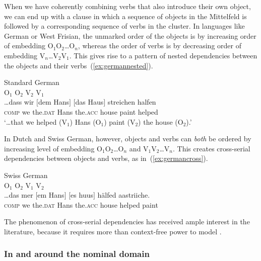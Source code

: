 \documentclass[output=paper,hidelinks]{langscibook}
\begin{document}
When we have coherently combining verbs that also introduce their own
object, we can end up with a clause in which a sequence of objects in
the Mittelfeld is followed by a corresponding sequence of verbs in the
cluster. In languages like German or West Frisian, the
unmarked order of the objects is by increasing order of embedding
O$_1$O$_2$\ldots{}O$_n$, whereas the order of verbs is by decreasing
order of embedding V$_n$\ldots{}V$_2$V$_1$. This gives rise to a
pattern of nested dependencies between the objects and their
verbs~(\ref{ex:germannested}).
%
\begin{exe}
  \ex \label{ex:germannested}Standard German\\
      {\glll
        {} {} \phantom{$[$}O$_1$ {} \phantom{$[$}O$_2$ {} V$_2$ V$_1$\\
        \ldots{}dass wir $[$dem Hans$]$ $[$das Haus$]$ streichen halfen\\
        \phantom{\ldots}\textsc{comp} we \phantom{$[$}the.\textsc{dat} Hans \phantom{$[$}the.\textsc{acc} house paint helped\\
          }
    \glt `\ldots that we helped (V$_1$) Hans (O$_1$) paint (V$_2$) the house (O$_2$).'

\end{exe}
%
In Dutch and Swiss German, however, objects and verbs can \textit{both} be
ordered by increasing level of embedding O$_1$O$_2$\ldots{}O$_n$ and
V$_1$V$_2$\ldots{}V$_n$. This creates cross-serial
dependencies between objects and verbs, as in~(\ref{ex:germancross}).
%
\begin{exe}
\ex \label{ex:germancross}Swiss German \citep[§2, example~1]{Shieber1985}\\
    {\glll
       {} {} \phantom{$[$}O$_1$ {} \phantom{$[$}O$_2$ {} V$_1$ V$_2$\\
      \ldots{}das mer $[$em Hans$]$ $[$es huus$]$ hälfed aastriiche.\\
            \phantom{\ldots}\textsc{comp} we \phantom{$[$}the.\textsc{dat} Hans \phantom{$[$}the.\textsc{acc} house helped paint\\}
\end{exe}
%
The phenomenon of cross-serial dependencies has received ample interest in the literature, because
it requires more than context-free power to model
\citep{BKPZ:Dutch,pullum-gazdar1982,Shieber1985}.

\subsubsection{In and around the nominal domain}
\end{document}
